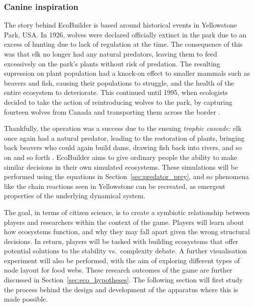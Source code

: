 \subsubsection{Canine inspiration}
\label{sec:yellowstone}
The story behind EcoBuilder is based around historical events in Yellowstone Park, USA. In 1926, wolves were declared officially extinct in the park due to an excess of hunting due to lack of regulation at the time. 
The consequence of this was that elk no longer had any natural predators, leaving them to feed excessively on the park's plants without risk of predation. The resulting supression on plant population had a knock-on effect to smaller mammals such as beavers and fish, causing their populations to struggle, and the health of the entire ecosystem to deteriorate.
This continued until 1995, when ecologists decided to take the action of reintroducing wolves to the park, by capturing fourteen wolves from Canada and transporting them across the border \cite{Smith2003}.

Thankfully, the operation was a success due to the ensuing \emph{trophic cascade:} elk once again had a natural predator, leading to the restoration of plants, bringing back beavers who could again build dams, drawing fish back into rivers, and so on and so forth \cite{Dobson2014}.
EcoBuilder aims to give ordinary people the ability to make similar decisions in their own simulated ecosystems. These simulations will be performed using the equations in Section~\ref{sec:predator_prey}, and so phenomena like the chain reactions seen in Yellowstone can be recreated, as emergent properties of the underlying dynamical system.

The goal, in terms of citizen science, is to create a symbiotic relationship between players and researchers within the context of the game.
Players will learn about how ecosystems function, and why they may fall apart given the wrong structural decisions. In return, players will be tasked with building ecosystems that offer potential solutions to the stability vs.\ complexity debate. A further visualisation experiment will also be performed, with the aim of exploring different types of node layout for food webs. These research outcomes of the game are further discussed in Section~\ref{sec:eco_hypotheses}.
The following section will first study the process behind the design and development of the apparatus where this is made possible.

